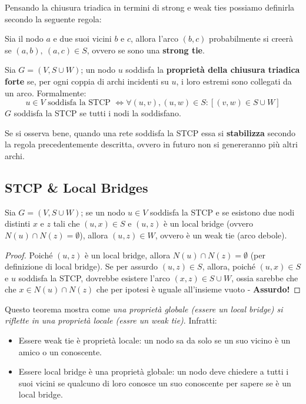 Pensando la chiusura triadica in termini di strong e weak ties possiamo definirla secondo la seguente regola:
\begin{definizione}
Sia il nodo $a$ e due suoi vicini $b$ e $c$, allora l'arco $(b,c)$ probabilmente si creerà se $(a,b),\ (a,c) \in S$, ovvero se sono una \textbf{strong tie}.
\end{definizione}

\begin{definizione}
Sia $G = (V, S\cup W)$; un nodo $u$ soddisfa la \textbf{proprietà della chiusura triadica forte} se, per ogni coppia di archi incidenti su $u$, i loro estremi sono collegati da un arco. Formalmente:
\[
u \in V \text{ soddisfa la STCP } \iff \forall(u, v),(u, w) \in S: [(v, w) \in S \cup W]
\]
$G$ soddisfa la STCP se tutti i nodi la soddisfano.
\end{definizione}
Se si osserva bene, quando una rete soddisfa la STCP essa si \textbf{stabilizza} secondo la regola precedentemente descritta, ovvero in futuro non si genereranno più altri archi.

\subsection{STCP \& Local Bridges}

\begin{teorema}
    Sia $G=(V, S \cup W)$; se un nodo $u \in V$ soddisfa la STCP e se esistono due nodi distinti $x$ e $z$ tali che $(u, x) \in S$ e $(u, z)$ è un local bridge (ovvero $N(u) \cap N(z) = \emptyset$), allora $(u,z) \in W$, ovvero è un weak tie (arco debole).
\end{teorema}
\begin{proof}
    Poiché $(u,z)$ è un local bridge, allora $N(u) \cap N(z) = \emptyset$ (per definizione di local bridge). Se per assurdo $(u, z) \in S$, allora, poiché $(u,x) \in S$ e $u$ soddisfa la STCP, dovrebbe esistere l'arco $(x, z) \in S \cup W$, ossia sarebbe che che $x \in N(u) \cap N(z)$ che per ipotesi è uguale all'insieme vuoto - \textbf{Assurdo!}
\end{proof}

Questo teorema mostra come \textit{una proprietà globale (essere un local bridge) si riflette in una proprietà locale (essre un weak tie)}. Infratti:
\begin{itemize}
    \item Essere weak tie è proprietà locale: un nodo sa da solo se un suo vicino è un amico o un conoscente.
    \item Essere local bridge è una proprietà globale: un nodo deve chiedere a tutti i suoi vicini se qualcuno di loro conosce un suo conoscente per sapere se è un local bridge.
\end{itemize}

